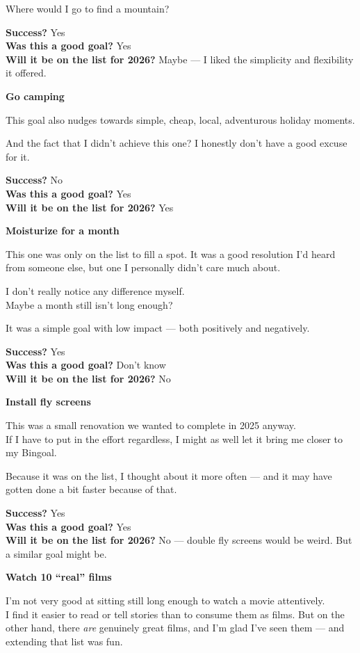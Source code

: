 \documentclass[12pt]{article}
\begin{document}
Where would I go to find a mountain?

\textbf{Success?} Yes\\
\textbf{Was this a good goal?} Yes\\
\textbf{Will it be on the list for 2026?} Maybe --- I liked the
simplicity and flexibility it offered.

\textbf{Go camping}

This goal also nudges towards simple, cheap, local, adventurous holiday
moments.

And the fact that I didn't achieve this one? I honestly don't have a
good excuse for it.

\textbf{Success?} No\\
\textbf{Was this a good goal?} Yes\\
\textbf{Will it be on the list for 2026?} Yes

\textbf{Moisturize for a month}

This one was only on the list to fill a spot. It was a good resolution
I'd heard from someone else, but one I personally didn't care much
about.

I don't really notice any difference myself.\\
Maybe a month still isn't long enough?

It was a simple goal with low impact --- both positively and negatively.

\textbf{Success?} Yes\\
\textbf{Was this a good goal?} Don't know\\
\textbf{Will it be on the list for 2026?} No

\textbf{Install fly screens}

This was a small renovation we wanted to complete in 2025 anyway.\\
If I have to put in the effort regardless, I might as well let it bring
me closer to my Bingoal.

Because it was on the list, I thought about it more often --- and it may
have gotten done a bit faster because of that.

\textbf{Success?} Yes\\
\textbf{Was this a good goal?} Yes\\
\textbf{Will it be on the list for 2026?} No --- double fly screens
would be weird. But a similar goal might be.

\textbf{Watch 10 ``real'' films}

I'm not very good at sitting still long enough to watch a movie
attentively.\\
I find it easier to read or tell stories than to consume them as films.
But on the other hand, there \emph{are} genuinely great films, and I'm
glad I've seen them --- and extending that list was fun.
\end{document}
